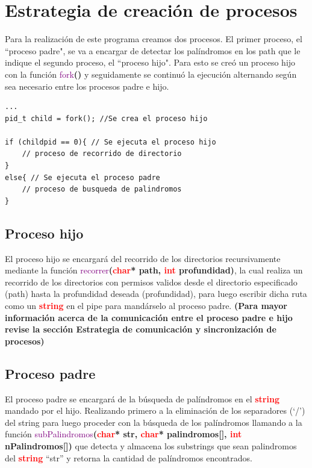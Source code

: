 \documentclass[12pt,letterpaper]{article}
\begin{document}
\section{Estrategia de creación de procesos}
   Para la realización de este programa creamos dos procesos. El primer proceso, el ``proceso padre", se va a encargar de detectar los palíndromos en los path que le indique el segundo proceso, el ``proceso hijo".
   Para esto se creó un proceso hijo con la función \textcolor{purple}{fork}\textbf{()} y seguidamente se continuó la ejecución alternando según sea necesario entre los procesos padre e hijo.

\begin{lstlisting}[style=C]
...
pid_t child = fork(); //Se crea el proceso hijo

if (childpid == 0){ // Se ejecuta el proceso hijo
	// proceso de recorrido de directorio
}
else{ // Se ejecuta el proceso padre
	// proceso de busqueda de palindromos
}
\end{lstlisting}
   
\subsection{\large{Proceso hijo}}
   El proceso hijo se encargará del recorrido de los directorios recursivamente mediante la función \textcolor{purple}{recorrer}\textbf{(\textcolor{red}{char}* path, \textcolor{red}{int} profundidad)}, la cual realiza un recorrido de los directorios con permisos validos desde el directorio especificado (path) hasta la profundidad deseada (profundidad), para luego escribir dicha ruta como un \textbf{\textcolor{red}{string}} en el pipe para mandárselo al proceso padre. \textbf{(Para mayor información acerca de la comunicación entre el proceso padre e hijo revise la sección Estrategia de comunicación y sincronización de procesos)}
   
\subsection{\large{Proceso padre}}
   El proceso padre se encargará de la búsqueda de palíndromos en el \textbf{\textcolor{red}{string}} mandado por el hijo. Realizando primero a la eliminación de los separadores (`/') del string para luego proceder con la búsqueda de los palíndromos llamando a la función \textcolor{purple}{subPalindromos}\textbf{(\textcolor{red}{char}* str, \textcolor{red}{char}* palindromos[], \textcolor{red}{int} nPalindromos[])} que detecta y almacena los substrings que sean palindromos del \textbf{\textcolor{red}{string}} ``str'' y retorna la cantidad de palíndromos encontrados.
\end{document}
